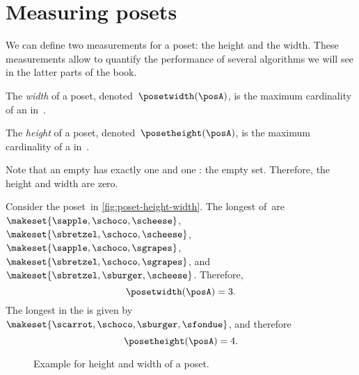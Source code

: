 
\section{Measuring posets}
We can define two measurements for a poset: the height and the width.
These measurements allow to quantify the performance of several algorithms we will see in the latter parts of the book.
\begin{definition}
    \label{def:poset-width}
    The \emph{width} of a poset, denoted~$\posetwidth(\posA)$, is the maximum cardinality of an  in~\posA.
\end{definition}

\begin{definition}
    \label{def:poset-height}
    The \emph{height} of a poset, denoted~$\posetheight(\posA)$, is the maximum cardinality of a  in~\posA.
\end{definition}

Note that an empty  has exactly one  and one  : the empty set.
Therefore, the height and width are zero.

\begin{example}
    Consider the poset~\posA in \cref{fig:poset-height-width}.
    The longest  of~\posA are~$\makeset{\sapple, \schoco, \scheese}$, $\makeset{\sbretzel, \schoco, \scheese}$, $\makeset{\sapple, \schoco, \sgrapes}$, $\makeset{\sbretzel, \schoco, \sgrapes}$, and~$\makeset{\sbretzel, \sburger, \scheese}$.
    Therefore,
    \begin{equation}\label{eq:poset-height-width-1}
        \posetwidth(\posA)=3.
    \end{equation}
    The longest  in the  is given by~$\makeset{\scarrot,\schoco,\sburger,\sfondue}$, and therefore
    \begin{equation}\label{eq:poset-height-width-2}
        \posetheight(\posA)=4.
    \end{equation}
\end{example}

\begin{figure*}[h]
    \caption{Example for height and width of a poset.
    }
\end{figure*}

